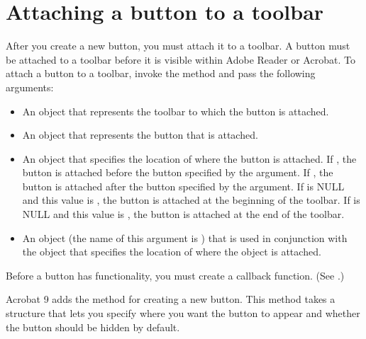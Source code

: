 \documentclass[letterpaper,12pt,english,openany,oneside]{sphinxmanual}
\begin{document}
\section{Attaching a button to a toolbar}
\label{\detokenize{Plugins_Toolbutton:attaching-a-button-to-a-toolbar}}
After you create a new button, you must attach it to a toolbar. A button must be attached to a toolbar before it is visible within Adobe Reader or Acrobat. To attach a button to a toolbar, invoke the  method and pass the following arguments:
\begin{itemize}
\item {} 
An  object that represents the toolbar to which the button is attached.

\item {} 
An  object that represents the button that is attached.

\item {} 
An  object that specifies the location of where the button is attached. If , the button is attached before the button specified by the  argument. If , the button is attached after the button specified by the  argument. If  is NULL and this value is , the button is attached at the beginning of the toolbar. If  is NULL and this value is , the button is attached at the end of the toolbar.

\item {} 
An  object (the name of this argument is  ) that is used in conjunction with the  object that specifies the location of where the  object is attached.

\end{itemize}

Before a button has functionality, you must create a callback function. (See .)

Acrobat 9 adds the  method for creating a new button. This method takes a structure that lets you specify where you want the button to appear and whether the button should be hidden by default.
\end{document}
